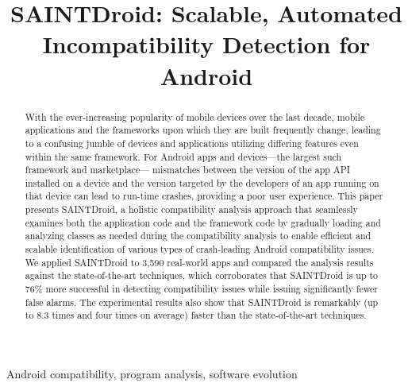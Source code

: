 \documentclass[10pt,journal]{IEEEtran}
\makeatletter
\def \@approach{\textsc{SAINTdroid}}
\makeatother
\begin{document}
\title{SAINTDroid: Scalable, Automated \\Incompatibility Detection for Android} 

\maketitle

\begin{abstract}
With the ever-increasing popularity of mobile devices over the last decade, mobile applications and the frameworks upon which they are built frequently change, leading to a confusing jumble of devices and applications utilizing differing features even within the same framework. For Android apps and devices—the largest such framework and marketplace— mismatches between the version of the app API installed on a device and the version targeted by the developers of an app running on that device can lead to run-time crashes, providing a poor user experience. 
This paper presents SAINTDroid, a holistic compatibility analysis approach that seamlessly examines both the application code and the framework code by gradually loading and analyzing classes as needed during the compatibility analysis to enable efficient and scalable identification of various types of crash-leading Android compatibility issues. We applied SAINTDroid to 3,590 real-world apps and compared the analysis results against the state-of-the-art techniques, which corroborates that SAINTDroid is up to 76\% more successful in detecting compatibility issues while issuing significantly fewer false alarms. The experimental results also show that SAINTDroid is remarkably (up to 8.3 times and four times on average) faster than the state-of-the-art techniques.
\end{abstract}



\begin{IEEEkeywords}
Android compatibility, program analysis, software evolution
\end{IEEEkeywords}










\balance
%


\end{document}

